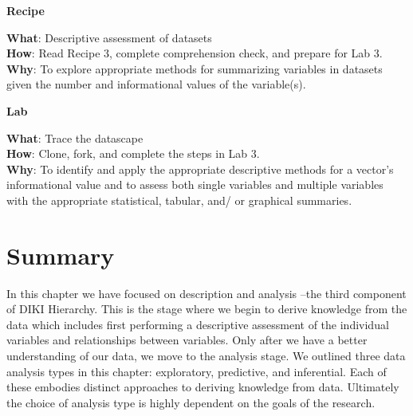 \documentclass[
  letterpaper,
]{latex/krantz}
\theoremstyle{definition}
\theoremstyle{remark}
\begin{document}
\begin{tcolorbox}[enhanced jigsaw, colframe=quarto-callout-color-frame, breakable, bottomrule=.15mm, arc=.35mm, left=2mm, opacityback=0, rightrule=.15mm, colback=white, toprule=.15mm, leftrule=.75mm]

\textbf{ Recipe}

\textbf{What}: Descriptive assessment of datasets\\
\textbf{How}: Read Recipe 3, complete comprehension check, and prepare
for Lab 3.\\
\textbf{Why}: To explore appropriate methods for summarizing variables
in datasets given the number and informational values of the
variable(s).

\end{tcolorbox}

\begin{tcolorbox}[enhanced jigsaw, colframe=quarto-callout-color-frame, breakable, bottomrule=.15mm, arc=.35mm, left=2mm, opacityback=0, rightrule=.15mm, colback=white, toprule=.15mm, leftrule=.75mm]

\textbf{ Lab}

\textbf{What}: Trace the datascape\\
\textbf{How}: Clone, fork, and complete the steps in Lab 3.\\
\textbf{Why}: To identify and apply the appropriate descriptive methods
for a vector's informational value and to assess both single variables
and multiple variables with the appropriate statistical, tabular, and/
or graphical summaries.

\end{tcolorbox}

\section*{Summary}\label{summary-2}


In this chapter we have focused on description and analysis --the third
component of DIKI Hierarchy. This is the stage where we begin to derive
knowledge from the data which includes first performing a descriptive
assessment of the individual variables and relationships between
variables. Only after we have a better understanding of our data, we
move to the analysis stage. We outlined three data analysis types in
this chapter: exploratory, predictive, and inferential. Each of these
embodies distinct approaches to deriving knowledge from data. Ultimately
the choice of analysis type is highly dependent on the goals of the
research.
\end{document}
